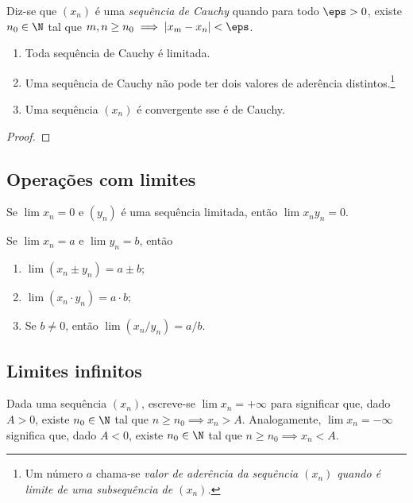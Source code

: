 \documentclass{article}
\begin{document}
\begin{defn} 
    Diz-se que \((x_n)\) é uma \emph{sequência de Cauchy} quando para todo \(\eps > 0\), existe \(n_0 \in \N\) tal que \(m, n \geq n_0 \implies |x_m - x_n| < \eps\).
\end{defn}

\begin{prop}
    \begin{enumerate}
        \item [(a)] Toda sequência de Cauchy é limitada.
        \item [(b)] Uma sequência de Cauchy não pode ter dois valores de aderência distintos.\footnote{Um número \(a\) chama-se \emph{valor de aderência da sequência \((x_n)\) quando é limite de uma subsequência de \((x_n)\).}}
        \item [(c)] Uma sequência \((x_n)\) é convergente sse é de Cauchy.
    \end{enumerate}
\end{prop}

\begin{proof}
    
\end{proof}

\subsection{Operações com limites}

\begin{prop}
    Se \(\lim x_n = 0\) e \((y_n)\) é uma sequência limitada, então \(\lim x_n y_n = 0\).
\end{prop}

\begin{thm}
    Se \(\lim x_n = a\) e \(\lim y_n = b\), então
    \begin{enumerate}
        \item [(i)] \(\lim (x_n \pm y_n) = a \pm b\);
        \item [(ii)] \(\lim (x_n \cdot y_n) = a \cdot b\);
        \item [(iii)] Se \(b \neq 0\), então \(\lim (x_n / y_n) = a / b\).
    \end{enumerate}
\end{thm}

\subsection{Limites infinitos}

\begin{defn}
    Dada uma sequência \((x_n)\), escreve-se \(\lim x_n = +\infty\) para significar que, dado \(A > 0\), existe \(n_0 \in \N\) tal que \(n \geq n_0 \implies x_n > A\).
    Analogamente, \(\lim x_n = -\infty\) significa que, dado \(A < 0\), existe \(n_0 \in \N\) tal que \(n \geq n_0 \implies x_n < A\).
\end{defn}
\end{document}
